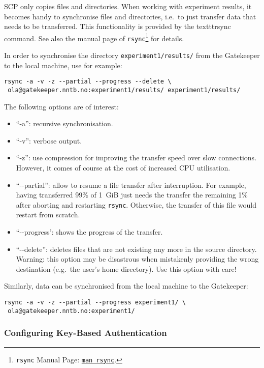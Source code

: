 SCP only copies files and directories. When working with  experiment results, it becomes handy to synchronise files and directories, i.e.\ to just transfer data that needs to be transferred. This functionality is provided by the texttt{rsync} command. See also the manual page of \texttt{rsync}\footnote{\texttt{rsync} Manual Page: \texttt{\href{man:rsync}{man rsync}}.} for details.

In order to synchronise the directory \texttt{experiment1/results/} from the Gatekeeper to the local machine, use for example:
\begin{lstlisting}
rsync -a -v -z --partial --progress --delete \
 ola@gatekeeper.nntb.no:experiment1/results/ experiment1/results/
\end{lstlisting}
The following options are of interest:
\begin{itemize}
 \item ``-a'': recursive synchronisation.
 \item ``-v'': verbose output.
 \item ``-z'': use compression for improving the transfer speed over slow connections. However, it comes of course at the cost of increased CPU utilisation.
 \item ``-\--partial'': allow to resume a file transfer after interruption. For example, having transferred 99\% of 1~GiB just needs the transfer the remaining 1\% after aborting and restarting \texttt{rsync}. Otherwise, the transfer of this file would restart from scratch.
 \item ``-\--progress': shows the progress of the transfer.
 \item ``-\--delete'': deletes files that are not existing any more in the source directory. Warning: this option may be disastrous when mistakenly providing the wrong destination (e.g.\ the user's home directory). Use this option with care!
\end{itemize}

Similarly, data can be synchronised from the local machine to the Gatekeeper:
\begin{lstlisting}
rsync -a -v -z --partial --progress experiment1/ \
 ola@gatekeeper.nntb.no:experiment1/
\end{lstlisting}


\subsubsection{Configuring Key-Based Authentication}
\label{subsub:Key-Based-Authentication}

